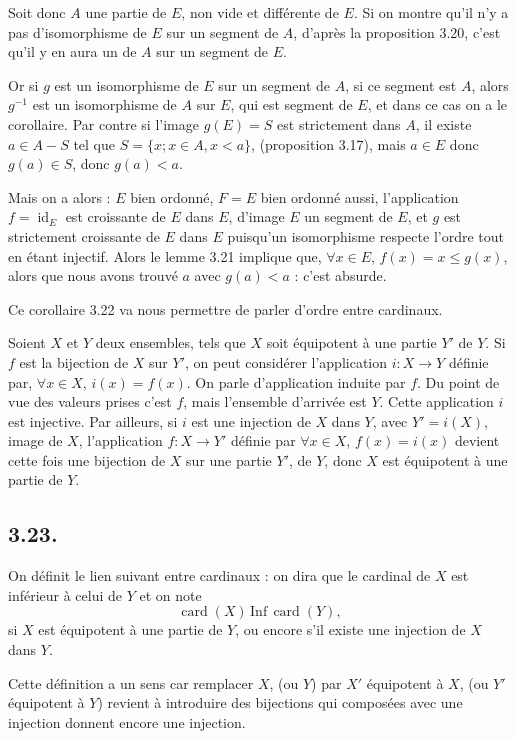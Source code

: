Soit donc $A$ une partie de $E$, non vide et différente de $E$. Si on montre qu'il n'y a pas d'isomorphisme de $E$ sur un segment de $A$, d'après la proposition 3.20, c'est qu'il y en aura un de $A$ sur un segment de $E$.

Or si $g$ est un isomorphisme de $E$ sur un segment de $A$, si ce segment est $A$, alors $g^{-1}$ est un isomorphisme de $A$ sur $E$, qui est segment de $E$, et dans ce cas on a le corollaire. Par contre si l'image $g(E)=S$ est strictement dans $A$, il existe $a\in A-S$ tel que $S=\{x;x\in A,x<a\}$, (proposition 3.17), mais $a\in E$ donc $g(a)\in S$, donc $g(a)<a$.

Mais on a alors : $E$ bien ordonné, $F=E$ bien ordonné aussi, l'application $f=\operatorname{id}_E$ est croissante de $E$ dans $E$, d'image $E$ un segment de $E$, et $g$ est strictement croissante de $E$ dans $E$ puisqu'un isomorphisme respecte l'ordre tout en étant injectif. Alors le lemme 3.21 implique que, $\forall x\in E$, $f(x)=x\le g(x)$, alors que nous avons trouvé $a$ avec $g(a)<a$ : c'est absurde. \bookend

Ce corollaire 3.22 va nous permettre de parler d'ordre entre cardinaux.

Soient $X$ et $Y$ deux ensembles, tels que $X$ soit équipotent à une partie $Y'$ de $Y$. Si $f$ est la bijection de $X$ sur $Y'$, on peut considérer l'application $i:X\longrightarrow Y$ définie par, $\forall x\in X$, $i(x)=f(x)$. On parle d'application induite par $f$. Du point de vue des valeurs prises c'est $f$, mais l'ensemble d'arrivée est $Y$. Cette application $i$ est injective. Par ailleurs, si $i$ est une injection de $X$ dans $Y$, avec $Y'=i(X)$, image de $X$, l'application $f:X\longrightarrow Y'$ définie par $\forall x\in X$, $f(x)=i(x)$ devient cette fois une bijection de $X$ sur une partie $Y'$, de $Y$, donc $X$ est équipotent à une partie de $Y$.

\subsection*{3.23.}
On définit le lien suivant entre cardinaux : on dira que le cardinal de $X$ est inférieur à celui de $Y$ et on note
\[
\operatorname{card}(X)\,\mathrm{Inf}\,\operatorname{card}(Y),
\]
si $X$ est équipotent à une partie de $Y$, ou encore s'il existe une injection de $X$ dans $Y$.

Cette définition a un sens car remplacer $X$, (ou $Y$) par $X'$ équipotent à $X$, (ou $Y'$ équipotent à $Y$) revient à introduire des bijections qui composées avec une injection donnent encore une injection.


